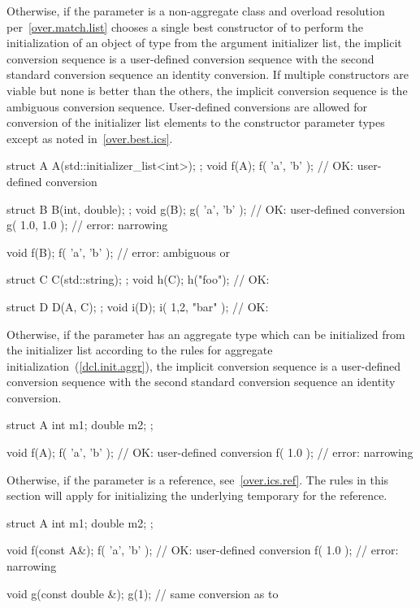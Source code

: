\pnum
Otherwise, if the parameter is a non-aggregate class  and overload
resolution per~\ref{over.match.list} chooses a single best constructor of
 to perform the initialization of an object of type  from the
argument initializer list, the implicit conversion sequence is a user-defined
conversion sequence with the second standard conversion sequence an
identity conversion. If multiple constructors are viable but none is better than
the others, the implicit conversion sequence is the ambiguous conversion
sequence. User-defined conversions are allowed for conversion of the initializer
list elements to the constructor parameter types except as noted
in~\ref{over.best.ics}. \enterexample
\begin{codeblock}
struct A {
  A(std::initializer_list<int>);
};
void f(A);
f( {'a', 'b'} );            // OK:  user-defined conversion

struct B {
  B(int, double);
};
void g(B);
g( {'a', 'b'} );            // OK:  user-defined conversion
g( {1.0, 1.0} );            // error: narrowing

void f(B);
f( {'a', 'b'} );            // error: ambiguous  or 

struct C {
  C(std::string);
};
void h(C);
h({"foo"});                 // OK: 

struct D {
  D(A, C);
};
void i(D);
i({ {1,2}, {"bar"} });      // OK: 
\end{codeblock}
\exitexample

\pnum
Otherwise, if the parameter has an aggregate type which can be initialized from
the initializer list according to the rules for aggregate
initialization~(\ref{dcl.init.aggr}), the implicit conversion sequence is a
user-defined conversion sequence with the second standard conversion
sequence an identity conversion. \enterexample
\begin{codeblock}
struct A {
  int m1;
  double m2;
};

void f(A);
f( {'a', 'b'} );            // OK:  user-defined conversion 
f( {1.0} );                 // error: narrowing
\end{codeblock}
\exitexample

\pnum
Otherwise, if the parameter is a reference, see~\ref{over.ics.ref}. \enternote
The rules in this section will apply for initializing the underlying temporary
for the reference. \exitnote \enterexample
\begin{codeblock}
struct A {
  int m1;
  double m2;
};

void f(const A&);
f( {'a', 'b'} );            // OK:  user-defined conversion 
f( {1.0} );                 // error: narrowing

void g(const double &);
g({1});                     // same conversion as  to 
\end{codeblock}
\exitexample

